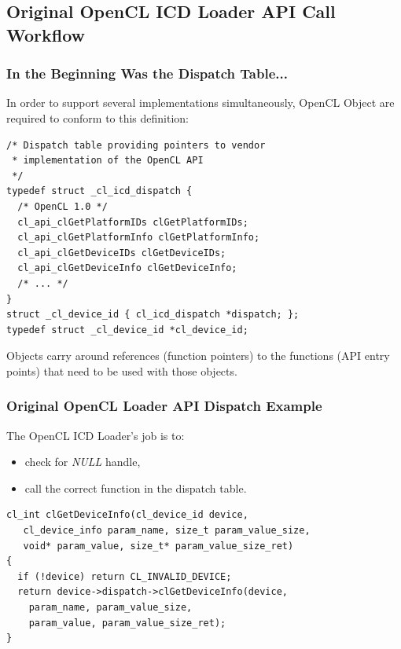 \documentclass[
    ignorenonframetext,
  ]{beamer}
\begin{document}
\subsection[API Call]{Original OpenCL ICD Loader API Call Workflow}


\begin{frame}[fragile]
  \frametitle{In the Beginning Was the Dispatch Table...}
  In order to support several implementations simultaneously, OpenCL Object are
  required to conform to this definition:
  \tiny
  \begin{verbatim}
/* Dispatch table providing pointers to vendor
 * implementation of the OpenCL API
 */
typedef struct _cl_icd_dispatch {
  /* OpenCL 1.0 */
  cl_api_clGetPlatformIDs clGetPlatformIDs;
  cl_api_clGetPlatformInfo clGetPlatformInfo;
  cl_api_clGetDeviceIDs clGetDeviceIDs;
  cl_api_clGetDeviceInfo clGetDeviceInfo;
  /* ... */
}
struct _cl_device_id { cl_icd_dispatch *dispatch; };
typedef struct _cl_device_id *cl_device_id;
\end{verbatim}
  \normalsize
  Objects carry around references (function pointers) to the functions (API
  entry points) that need to be used with those objects.
\end{frame}

\begin{frame}[fragile]
  \frametitle{Original OpenCL Loader API Dispatch Example}
  The OpenCL ICD Loader's job is to:
  \begin{itemize}
    \item check for \textit{NULL} handle,
    \item call the correct function in the dispatch table.
  \end{itemize}
  \tiny
  \begin{verbatim}
cl_int clGetDeviceInfo(cl_device_id device,
   cl_device_info param_name, size_t param_value_size,
   void* param_value, size_t* param_value_size_ret)
{
  if (!device) return CL_INVALID_DEVICE;
  return device->dispatch->clGetDeviceInfo(device,
    param_name, param_value_size,
    param_value, param_value_size_ret);
}
\end{verbatim}
\end{frame}
\end{document}
